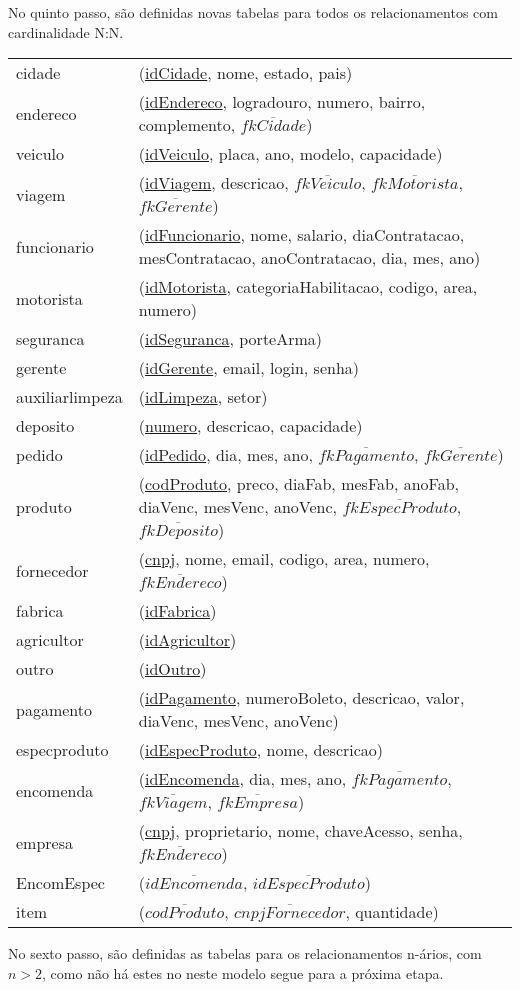 \documentclass[12pt, onecolumn, titlepage]{article}
\begin{document}
No quinto passo, são definidas novas tabelas para todos os relacionamentos com cardinalidade N:N.

\begin{table}[htb!]
\begin{center}
\begin{tabular}{p{2.5cm} p{10.5cm}}
cidade & (\underline{idCidade}, nome, estado, pais) \\
endereco & (\underline{idEndereco}, logradouro, numero, bairro, complemento, $\overline{fkCidade}$) \\
veiculo & (\underline{idVeiculo}, placa, ano, modelo, capacidade) \\
viagem & (\underline{idViagem}, descricao, $\overline{fkVeiculo}$, $\overline{fkMotorista}$, $\overline{fkGerente}$) \\
funcionario & (\underline{idFuncionario}, nome, salario, diaContratacao, mesContratacao, anoContratacao, dia, mes, ano)\\
motorista & (\underline{idMotorista}, categoriaHabilitacao, codigo, area, numero)\\
seguranca & (\underline{idSeguranca}, porteArma)\\
gerente & (\underline{idGerente}, email, login, senha)\\
auxiliarlimpeza & (\underline{idLimpeza}, setor)\\
deposito & (\underline{numero}, descricao, capacidade)\\
pedido & (\underline{idPedido}, dia, mes, ano, $\overline{fkPagamento}$, $\overline{fkGerente}$)\\
produto & (\underline{codProduto}, preco, diaFab, mesFab, anoFab, diaVenc, mesVenc, anoVenc, $\overline{fkEspecProduto}$, $\overline{fkDeposito}$)\\
fornecedor & (\underline{cnpj}, nome, email, codigo, area, numero, $\overline{fkEndereco}$)\\
fabrica & (\underline{idFabrica})\\
agricultor & (\underline{idAgricultor})\\
outro & (\underline{idOutro})\\
pagamento & (\underline{idPagamento}, numeroBoleto, descricao, valor, diaVenc, mesVenc, anoVenc)\\
especproduto & (\underline{idEspecProduto}, nome, descricao)\\
encomenda & (\underline{idEncomenda}, dia, mes, ano, $\overline{fkPagamento}$, $\overline{fkViagem}$, $\overline{fkEmpresa}$)\\
empresa & (\underline{cnpj}, proprietario, nome, chaveAcesso, senha, $\overline{fkEndereco}$)\\
EncomEspec & (\underline{$\overline{idEncomenda}$}, \underline{$\overline{idEspecProduto}$})\\
item & (\underline{$\overline{codProduto}$}, \underline{$\overline{cnpjFornecedor}$}, quantidade)
\end{tabular}
\end{center}
\end{table}
\newpage
No sexto passo, são definidas as tabelas para os relacionamentos n-ários, com $n > 2$, como não há estes no neste modelo segue para a próxima etapa.
\end{document}
